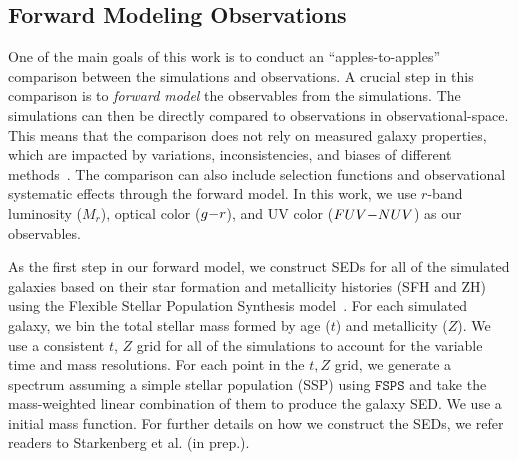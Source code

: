 \subsection{Forward Modeling Observations} \label{sec:fm} 
One of the main goals of this work is to conduct an ``apples-to-apples''
comparison between the simulations and observations. 
A crucial step in this comparison is to \emph{forward model} the
observables from the simulations. 
The simulations can then be directly compared to observations in
observational-space. 
This means that the comparison does not rely on measured galaxy properties,
which are impacted by variations, inconsistencies, and biases of different
methods~\citep{dickey2020}. 
The comparison can also include selection functions and observational systematic
effects through the forward model. 
In this work, we use $r$-band luminosity ($M_r$), optical color ($g{-}r$),
and UV color ($FUV{-}NUV$) as our observables. 

As the first step in our forward model, we construct SEDs for all
of the simulated galaxies based on their star formation and metallicity
histories (SFH and ZH) using the Flexible Stellar Population Synthesis
model~\citep[$\mathtt{FSPS}$;][]{conroy2009, conroy2010}. For each simulated
galaxy, we bin the total stellar mass formed by age ($t$) and metallicity
($Z$). We use a consistent $t$, $Z$ grid for all of the simulations
to account for the variable time and mass resolutions. For each point in the
$t, Z$ grid, we generate a spectrum assuming a simple stellar population (SSP)
using $\mathtt{FSPS}$ and take the mass-weighted linear combination of them to
produce the galaxy SED. We use a
\cite{chabrier2003} initial mass function. For further details on how we
construct the SEDs, we refer readers to Starkenberg et al. (in prep.).



